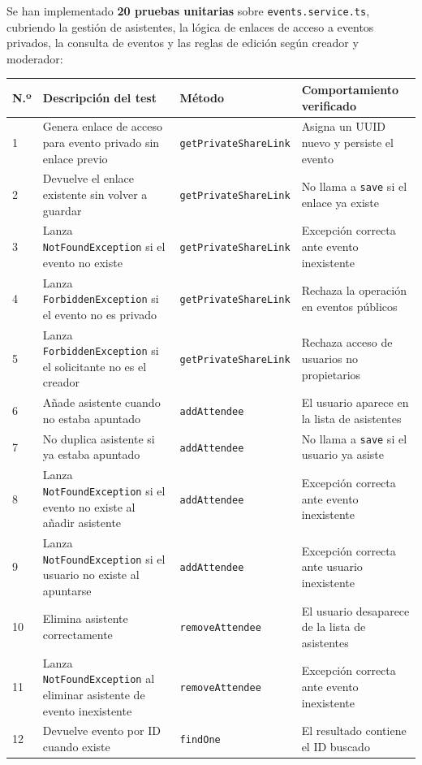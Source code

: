 Se han implementado \textbf{20 pruebas unitarias} sobre \texttt{events.service.ts}, cubriendo la gestión de asistentes, la lógica de enlaces de acceso a eventos privados, la consulta de eventos y las reglas de edición según creador y moderador:

\begin{longtable}{|p{0.5cm}|p{5.5cm}|p{3.8cm}|p{4.5cm}|}
\hline
\textbf{N.º} & \textbf{Descripción del test} & \textbf{Método} & \textbf{Comportamiento verificado} \\
\hline
1 & Genera enlace de acceso para evento privado sin enlace previo & \texttt{getPrivateShareLink} & Asigna un UUID nuevo y persiste el evento \\
\hline
2 & Devuelve el enlace existente sin volver a guardar & \texttt{getPrivateShareLink} & No llama a \texttt{save} si el enlace ya existe \\
\hline
3 & Lanza \texttt{NotFoundException} si el evento no existe & \texttt{getPrivateShareLink} & Excepción correcta ante evento inexistente \\
\hline
4 & Lanza \texttt{ForbiddenException} si el evento no es privado & \texttt{getPrivateShareLink} & Rechaza la operación en eventos públicos \\
\hline
5 & Lanza \texttt{ForbiddenException} si el solicitante no es el creador & \texttt{getPrivateShareLink} & Rechaza acceso de usuarios no propietarios \\
\hline
6 & Añade asistente cuando no estaba apuntado & \texttt{addAttendee} & El usuario aparece en la lista de asistentes \\
\hline
7 & No duplica asistente si ya estaba apuntado & \texttt{addAttendee} & No llama a \texttt{save} si el usuario ya asiste \\
\hline
8 & Lanza \texttt{NotFoundException} si el evento no existe al añadir asistente & \texttt{addAttendee} & Excepción correcta ante evento inexistente \\
\hline
9 & Lanza \texttt{NotFoundException} si el usuario no existe al apuntarse & \texttt{addAttendee} & Excepción correcta ante usuario inexistente \\
\hline
10 & Elimina asistente correctamente & \texttt{removeAttendee} & El usuario desaparece de la lista de asistentes \\
\hline
11 & Lanza \texttt{NotFoundException} al eliminar asistente de evento inexistente & \texttt{removeAttendee} & Excepción correcta ante evento inexistente \\
\hline
12 & Devuelve evento por ID cuando existe & \texttt{findOne} & El resultado contiene el ID buscado \\

\end{longtable}
